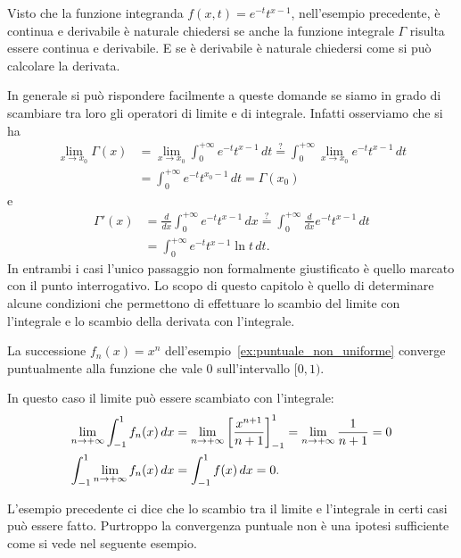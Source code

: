 Visto che la funzione integranda $f(x,t)=e^{-t}t^{x-1}$,
nell'esempio precedente,
è continua e derivabile
è naturale chiedersi se anche la funzione integrale $\Gamma$ 
risulta essere continua e derivabile. 
E se è derivabile è naturale chiedersi come si può calcolare
la derivata.

In generale si può rispondere facilmente a queste domande se siamo in grado di 
scambiare tra loro gli operatori di limite e di integrale. 
Infatti osserviamo che 
si ha 
\begin{align*}
  \lim_{x\to x_0} \Gamma(x) 
  &= \lim_{x\to x_0} \int_0^{+\infty} e^{-t}t^{x-1} \, dt 
  \stackrel{?}= \int_0^{+\infty} \lim_{x\to x_0} e^{-t}t^{x-1}\, dt\\
  &= \int_0^{+\infty} e^{-t}t^{x_0-1}\, dt
  = \Gamma(x_0)
\end{align*}
e 
\begin{align*}
  \Gamma'(x) 
  &= \frac{d}{dx} \int_0^{+\infty}e^{-t}t^{x-1}\, dx
  \stackrel{?}= \int_0^{+\infty} \frac{d}{dx}e^{-t}t^{x-1}\, dt \\
  &= \int_0^{+\infty} e^{-t}t^{x-1}\ln t\, dt.
\end{align*}
In entrambi i casi l'unico passaggio non formalmente giustificato è quello marcato
con il punto interrogativo. 
Lo scopo di questo capitolo è quello di determinare alcune condizioni che permettono 
di effettuare lo scambio del limite con l'integrale e lo scambio della derivata con l'integrale.


\begin{example}%
La successione $f_n(x)=x^n$ dell'esempio~\ref{ex:puntuale_non_uniforme}
converge puntualmente alla funzione che vale $0$ sull'intervallo $[0,1)$.

In questo caso il limite può essere scambiato con l'integrale:
\begin{align*}
\lim_{n\to +\infty} \int_{-1}^1 f_n(x)\, dx 
&= \lim_{n\to+\infty} {\left[ \frac{x^{n+1}}{n+1} \right]}_{-1}^1
 = \lim_{n\to+\infty} \frac{1}{n+1} = 0 \\
\int_{-1}^1 \lim_{n\to+\infty} f_n(x)\, dx 
&= \int_{-1}^1 f(x)\, dx = 0.
\end{align*}
\end{example}

L'esempio precedente ci dice che lo scambio tra il limite e l'integrale in certi casi 
può essere fatto. Purtroppo la convergenza puntuale non è una ipotesi sufficiente 
come si vede nel seguente esempio.

